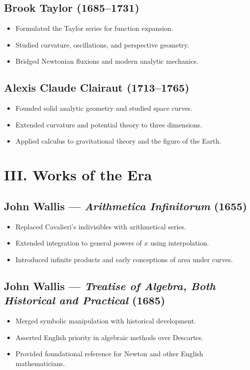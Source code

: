\documentclass[9pt]{article}
\begin{document}
\subsection*{Brook Taylor (1685–1731)}
\begin{itemize}
  \item Formulated the Taylor series for function expansion.
  \item Studied curvature, oscillations, and perspective geometry.
  \item Bridged Newtonian fluxions and modern analytic mechanics.
\end{itemize}

\subsection*{Alexis Claude Clairaut (1713–1765)}
\begin{itemize}
  \item Founded solid analytic geometry and studied space curves.
  \item Extended curvature and potential theory to three dimensions.
  \item Applied calculus to gravitational theory and the figure of the Earth.
\end{itemize}


\newpage

\section*{III. Works of the Era}

\subsection*{John Wallis — \textit{Arithmetica Infinitorum} (1655)}
\begin{itemize}
  \item Replaced Cavalieri’s indivisibles with arithmetical series.
  \item Extended integration to general powers of $x$ using interpolation.
  \item Introduced infinite products and early conceptions of area under curves.
\end{itemize}

\subsection*{John Wallis — \textit{Treatise of Algebra, Both Historical and Practical} (1685)}
\begin{itemize}
  \item Merged symbolic manipulation with historical development.
  \item Asserted English priority in algebraic methods over Descartes.
  \item Provided foundational reference for Newton and other English mathematicians.
\end{itemize}
\end{document}
